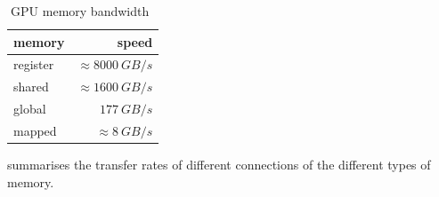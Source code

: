 \begin{table}[htb]
  \centering
  \begin{tabular}{l r}
    \toprule
    memory & speed \\
    \midrule
    register & $\approx \SI{8000}{GB/s}$ \\
    shared   & $\approx \SI{1600}{GB/s}$ \\
    global   & $\SI{177}{GB/s}$ \\
    mapped   & $\approx \SI{8}{GB/s}$ \\
  \end{tabular}
  \caption{GPU memory bandwidth~\cite{farber2011cuda}}
  \label{tab:hardware connections transfer rates}
\end{table}

 summarises the transfer rates of different connections of the different types of memory.
